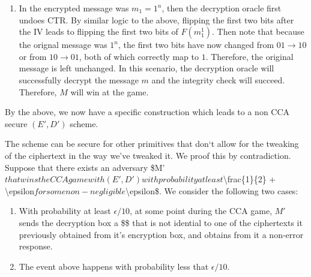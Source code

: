 \documentclass{article}
\begin{document}
\begin{enumerate}[,start=2]
\begin{enumerate}[,label=\alph*.]
\begin{mdbmarginx}{1ex}{0pt}{1ex}{0pt}
\begin{enumerate}[noitemsep,topsep=\mdcompacttopsep]
\item{}In the encrypted message was $m_1 = 1^n$, then the decryption oracle first undoes CTR. By
similar logic to the above, flipping the first two bits after the IV leads to flipping the first two
bits of $F(m^1_1)$.  Then note that because the orignal message was $1^n$, the first two bits have
now changed from $01 \to 10$ or from $10 \to 01$, both of which correctly map to $1$. Therefore,
the original message is left unchanged. In this scenario, the decryption oracle will successfully 
decrypt the message $m$ and the integrity check will succeed. Therefore, $M$ will win at the 
game.%
\end{enumerate}%

\noindent{}By the above, we now have a specific construction which leads to a non CCA secure $(E',D')$ scheme.%

The scheme can be secure for other primitives that don\textquoteleft{}t allow for the tweaking of the ciphertext
in the way we've tweaked it. We proof this by contradiction. Suppose that there exists an
adversary \$M\textquoteright{}$ that wins the CCA game with (E',D') with probability at least $\textbackslash{}frac\{1\}\{2\} + \textbackslash{}epsilon$for some non-negligible $\textbackslash{}epsilon\$. We consider the following two cases:%

\begin{enumerate}[noitemsep,topsep=\mdcompacttopsep]%

\item{}With probability at least $\epsilon /10$, at some point during the CCA game, $M'$ sends the 
decryption box a \$\$ that is not idential to one of the ciphertexts it previously 
obtained from it's encryption box, and obtains from it a non-error response.%

\item{}The event above happens with probability less that $\epsilon /10$.%
\end{enumerate}%


\end{mdbmarginx}
\end{enumerate}
\end{enumerate}
\end{document}
